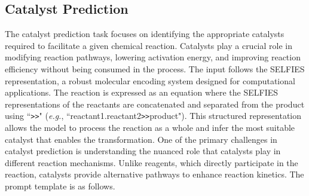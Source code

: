 \subsection{Catalyst Prediction}
The catalyst prediction task focuses on identifying the appropriate catalysts required to facilitate a given chemical reaction. Catalysts play a crucial role in modifying reaction pathways, lowering activation energy, and improving reaction efficiency without being consumed in the process. The input follows the SELFIES representation, a robust molecular encoding system designed for computational applications. The reaction is expressed as an equation where the SELFIES representations of the reactants are concatenated and separated from the product using ``{\tt >>}" (\emph{e.g.}, ``reactant1.reactant2{\tt >>}product"). This structured representation allows the model to process the reaction as a whole and infer the most suitable catalyst that enables the transformation.
One of the primary challenges in catalyst prediction is understanding the nuanced role that catalysts play in different reaction mechanisms. Unlike reagents, which directly participate in the reaction, catalysts provide alternative pathways to enhance reaction kinetics. The prompt template is as follows.

